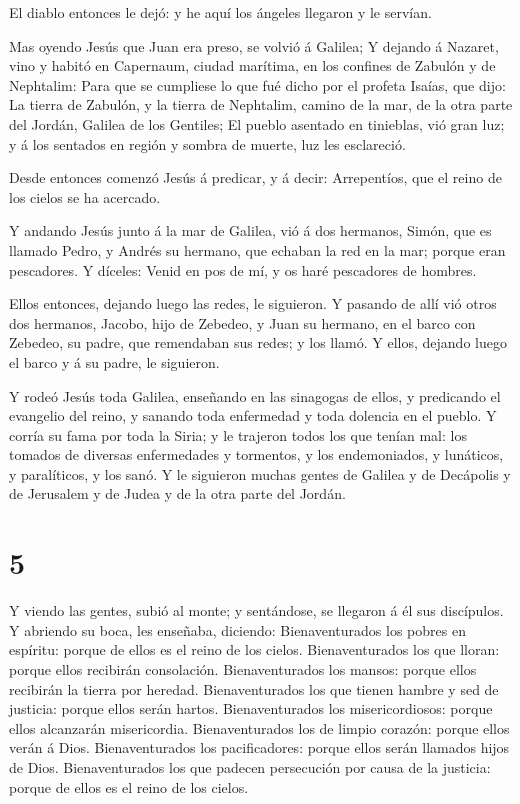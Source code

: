  El diablo entonces le dejó: y he aquí los ángeles llegaron
y le servían.

 Mas oyendo Jesús que Juan era preso, se volvió á Galilea;
 Y dejando á Nazaret, vino y habitó en Capernaum, ciudad
marítima, en los confines de Zabulón y de Nephtalim:  Para
que se cumpliese lo que fué dicho por el profeta Isaías, que dijo:
 La tierra de Zabulón, y la tierra de Nephtalim, camino de
la mar, de la otra parte del Jordán, Galilea de los Gentiles;
 El pueblo asentado en tinieblas, vió gran luz; y á los
sentados en región y sombra de muerte, luz les esclareció.

 Desde entonces comenzó Jesús á predicar, y á decir:
Arrepentíos, que el reino de los cielos se ha acercado.

 Y andando Jesús junto á la mar de Galilea, vió á dos
hermanos, Simón, que es llamado Pedro, y Andrés su hermano, que echaban
la red en la mar; porque eran pescadores.  Y díceles: Venid
en pos de mí, y os haré pescadores de hombres.

 Ellos entonces, dejando luego las redes, le siguieron.
 Y pasando de allí vió otros dos hermanos, Jacobo, hijo de
Zebedeo, y Juan su hermano, en el barco con Zebedeo, su padre, que
remendaban sus redes; y los llamó.  Y ellos, dejando luego
el barco y á su padre, le siguieron.

 Y rodeó Jesús toda Galilea, enseñando en las sinagogas de
ellos, y predicando el evangelio del reino, y sanando toda enfermedad y
toda dolencia en el pueblo.  Y corría su fama por toda la
Siria; y le trajeron todos los que tenían mal: los tomados de diversas
enfermedades y tormentos, y los endemoniados, y lunáticos, y
paralíticos, y los sanó.  Y le siguieron muchas gentes de
Galilea y de Decápolis y de Jerusalem y de Judea y de la otra parte del
Jordán.

\hypertarget{section-4}{%
\section{5}\label{section-4}}

 Y viendo las gentes, subió al monte; y sentándose, se
llegaron á él sus discípulos.  Y abriendo su boca, les
enseñaba, diciendo:  Bienaventurados los pobres en espíritu:
porque de ellos es el reino de los cielos.  Bienaventurados
los que lloran: porque ellos recibirán consolación. 
Bienaventurados los mansos: porque ellos recibirán la tierra por
heredad.  Bienaventurados los que tienen hambre y sed de
justicia: porque ellos serán hartos.  Bienaventurados los
misericordiosos: porque ellos alcanzarán misericordia. 
Bienaventurados los de limpio corazón: porque ellos verán á Dios.
 Bienaventurados los pacificadores: porque ellos serán
llamados hijos de Dios.  Bienaventurados los que padecen
persecución por causa de la justicia: porque de ellos es el reino de los
cielos.

